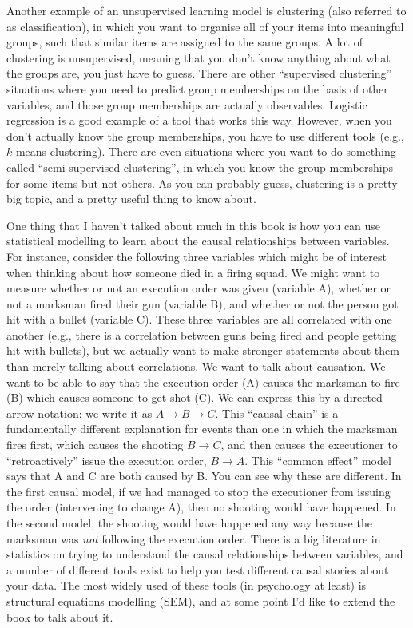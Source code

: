 \begin{itemize}
 Another example of an unsupervised learning model is clustering (also referred to as classification), in which you want to organise all of your items into meaningful groups, such that similar items are assigned to the same groups. A lot of clustering is unsupervised, meaning that you don't know anything about what the groups are, you just have to guess. There are other ``supervised clustering'' situations where you need to predict group memberships on the basis of other variables, and those group memberships are actually observables. Logistic regression is a good example of a tool that works this way. However, when you don't actually know the group memberships, you have to use different tools (e.g., $k$-means clustering). There are even situations where you want to do something called ``semi-supervised clustering'', in which you know the group memberships for some items but not others. As you can probably guess, clustering is a pretty big topic, and a pretty useful thing to know about. 


 One thing that I haven't talked about much in this book is how you can use statistical modelling to learn about the causal relationships between variables. For instance, consider the following three variables which might be of interest when thinking about how someone died in a firing squad. We might want to measure whether or not an execution order was given (variable A), whether or not a marksman fired their gun (variable B), and whether or not the person got hit with a bullet (variable C). These three variables are all correlated with one another (e.g., there is a correlation between guns being fired and people getting hit with bullets), but we actually want to make stronger statements about them than merely talking about correlations. We want to talk about causation. We want to be able to say that the execution order (A) causes the marksman to fire (B) which causes someone to get shot (C). We can express this by a directed arrow notation: we write it as $A \rightarrow B \rightarrow C$. This ``causal chain'' is a fundamentally different explanation for events than one in which the marksman fires first, which causes the shooting $B \rightarrow C$, and then causes the executioner to ``retroactively'' issue the execution order, $B \rightarrow A$. This ``common effect'' model says that A and C are both caused by B. You can see why these are different. In the first causal model, if we had managed to stop the executioner from issuing the order (intervening to change A), then no shooting would have happened. In the second model, the shooting would have happened any way because the marksman was {\it not} following the execution order. There is a big literature in statistics on trying to understand the causal relationships between variables, and a number of different tools exist to help you test different causal stories about your data. The most widely used of these tools (in psychology at least) is structural equations modelling (SEM), and at some point I'd like to extend the book to talk about it.

\end{itemize}
